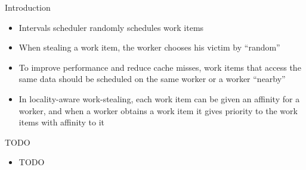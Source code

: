 \begin{frame}{Introduction}
  \begin{itemize}
  \item Intervals scheduler randomly schedules work items
  \item When stealing a work item, the worker chooses his victim by
    ``random''
  \item To improve performance and reduce cache misses, work items
    that access the same data should be scheduled on the same worker
    or a worker ``nearby''
  \item In locality-aware work-stealing, each work item can be given
    an affinity for a worker, and when a worker obtains a work item it
    gives priority to the work items with affinity to it
  \end{itemize}
\end{frame}

\begin{frame}{TODO}
  \begin{itemize}
  \item TODO
  \end{itemize}
\end{frame}




